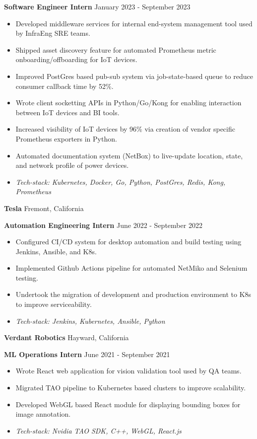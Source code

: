 \documentclass[11pt]{article}
\begin{document}
\textbf{Software Engineer Intern} \hfill January 2023 - September 2023
\begin{itemize}[noitemsep, topsep=0pt, partopsep=0pt, parsep=0pt]
    \item Developed middleware services for internal end-system management tool used by InfraEng SRE teams.
    \item Shipped asset discovery feature for automated Prometheus metric onboarding/offboarding for IoT devices. 
    \item Improved PostGres based pub-sub system via job-state-based queue to reduce consumer callback time by 52\%.
    \item Wrote client socketting APIs in Python/Go/Kong for enabling interaction between IoT devices and BI tools.
    \item Increased visibility of IoT devices by 96\% via creation of vendor specific Prometheus exporters in Python.
    \item Automated documentation system (NetBox) to live-update location, state, and network profile of power devices.
    \item \textit{Tech-stack: Kubernetes, Docker, Go, Python, PostGres, Redis, Kong, Prometheus}
\end{itemize}

\vspace{8pt}

\textbf{Tesla} \hfill Fremont, California

\textbf{Automation Engineering Intern} \hfill June 2022 - September 2022
\begin{itemize}[noitemsep, topsep=0pt, partopsep=0pt, parsep=0pt]
    \item Configured CI/CD system for desktop automation and build testing using Jenkins, Ansible, and K8s.
    \item Implemented Github Actions pipeline for automated NetMiko and Selenium testing.
    \item Undertook the migration of development and production environment to K8s to improve serviceability.
    \item \textit{Tech-stack: Jenkins, Kubernetes, Ansible, Python}
\end{itemize}

\vspace{8pt}

\textbf{Verdant Robotics} \hfill Hayward, California

\textbf{ML Operations Intern} \hfill June 2021 - September 2021 
\begin{itemize}[noitemsep, topsep=0pt, partopsep=0pt, parsep=0pt]
    \item Wrote React web application for vision validation tool used by QA teams.
    \item Migrated TAO pipeline to Kubernetes based clusters to improve scalability.
    \item Developed WebGL based React module for displaying bounding boxes for image annotation.
    \item \textit{Tech-stack: Nvidia TAO SDK, C++, WebGL, React.js}
\end{itemize}
\end{document}

